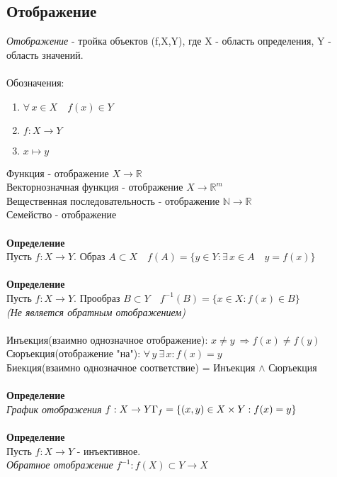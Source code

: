 \documentclass[12pt]{article}
\begin{document}
\subsection{Отображение}
\textit{Отображение} - тройка объектов (f,X,Y), где X - область определения, Y - область значений.\\\\
Обозначения:
\begin{enumerate}
    \item $\forall\,x \in X\quad f(x) \in Y$
    \item $f: X \rightarrow Y$
    \item $x \mapsto y$
\end{enumerate}
Функция - отображение $X \rightarrow \mathbb{R}$\\
Векторнозначная функция - отображение $X \rightarrow \mathbb{R}^m$\\
Вещественная последовательность - отображение $\mathbb{N} \rightarrow \mathbb{R}$\\
Семейство - отображение\\\\
\textbf{Определение}\\
Пусть $f:X \rightarrow Y$. Образ $A \subset X\quad f(A) = \{ y \in Y: \exists\,x \in A\quad y=f(x)\}$\\\\
\textbf{Определение}\\
Пусть $f:X \rightarrow Y$. Прообраз $B \subset Y\quad f^{-1}(B) = \{ x \in X: f(x) \in B\}$\\
\textit{(Не является обратным отображением)}\\\\
Инъекция(взаимно однозначное отображение): $x \neq y\ \Rightarrow f(x) \neq f(y)$\\
Сюръекция(отображение "на"): $\forall\,y\ \exists\,x: f(x)=y$\\
Биекция(взаимно однозначное соответствие) = Инъекция $\land$ Сюръекция\\\\
\textbf{Определение}\\
\textit{График отображения} $f:X\rightarrow Y\\ \Gamma_f=\{(x,y) \in X \times Y:f(x) = y\}$\\\\
\textbf{Определение}\\
Пусть $f:X\rightarrow Y$ - инъективное.\\
\textit{Обратное отображение} $f^{-1}:f(X) \subset Y\rightarrow X$\\
\end{document}
